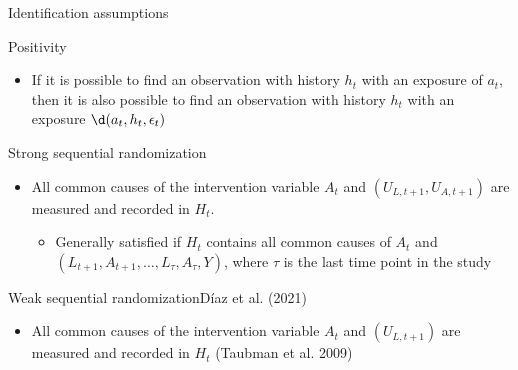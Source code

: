 \documentclass[
  10pt,
  ignorenonframetext,
]{beamer}
\providecommand{\tightlist}{%
  \setlength{\itemsep}{0pt}\setlength{\parskip}{0pt}}\usepackage{longtable,booktabs,array}
\begin{document}
\begin{frame}{Identification assumptions}
\protect\hypertarget{identification-assumptions}{}
\begin{block}{Positivity}
\protect\hypertarget{positivity}{}
\begin{itemize}
\tightlist
\item
  If it is possible to find an observation with history \(h_t\) with an
  exposure of \(a_t\), then it is also possible to find an observation
  with history \(h_t\) with an exposure \(\d(a_t, h_t, \epsilon_t)\)
\end{itemize}
\end{block}

\begin{block}{Strong sequential randomization}
\protect\hypertarget{strong-sequential-randomization}{}
\begin{itemize}
\tightlist
\item
  All common causes of the intervention variable \(A_t\) and
  \((U_{L,t+1}, U_{A,t+1})\) are measured and recorded in \(H_t\).

  \begin{itemize}
  \tightlist
  \item
    Generally satisfied if \(H_t\) contains all common causes of \(A_t\)
    and \((L_{t+1}, A_{t+1}, \ldots, L_\tau, A_\tau,\allowbreak Y)\),
    where \(\tau\) is the last time point in the study
  \end{itemize}
\end{itemize}
\end{block}

\begin{block}{Weak sequential randomizationDíaz et al. (2021)}
\protect\hypertarget{weak-sequential-randomizationrichardson2013single-diaz_nonparametric_2021}{}
\begin{itemize}
\tightlist
\item
  All common causes of the intervention variable \(A_t\) and
  \((U_{L,t+1})\) are measured and recorded in \(H_t\) (Taubman et al.
  2009)
\end{itemize}
\end{block}
\end{frame}
\end{document}
